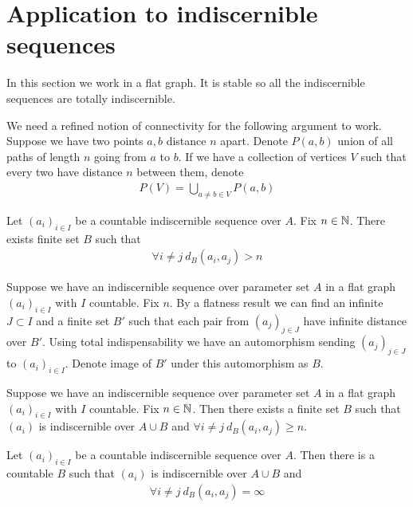 \documentclass{amsart}
\begin{document}
\section{Application to indiscernible sequences}

In this section we work in a flat graph. It is stable so all the indiscernible sequences are totally indiscernible.

We need a refined notion of connectivity for the following argument to work. Suppose we have two points $a,b$ distance $n$ apart. Denote $P(a,b)$ union of all paths of length $n$ going from $a$ to $b$. If we have a collection of vertices $V$ such that every two have distance $n$ between them, denote
\begin{align*}
	P(V) = \bigcup_{a \neq b \in V} P(a,b)
\end{align*}

\begin{Lemma}
	Let $(a_i)_{i \in I}$ be a countable indiscernible sequence over $A$. Fix $n \in \mathbb{N}$. There exists finite set $B$ such that
	\begin{align*}
		\forall i \neq j \ d_B(a_i, a_j) > n
	\end{align*}
\end{Lemma}

Suppose we have an indiscernible sequence over parameter set $A$ in a flat graph $(a_i)_{i \in I}$ with $I$ countable. Fix $n$. By a flatness result we can find an infinite $J \subset I$ and a finite set $B'$ such that each pair from $(a_j)_{j \in J}$ have infinite distance over $B'$. Using total 
indispensability we have an automorphism sending $(a_j)_{j \in J}$ to $(a_i)_{i \in I}$. Denote image of $B'$ under this automorphism as $B$.


\begin{Theorem}
	Suppose we have an indiscernible sequence over parameter set $A$ in a flat graph $(a_i)_{i \in I}$ with $I$ countable. Fix $n \in \mathbb{N}$. Then there exists a finite set $B$ such that $(a_i)$ is indiscernible over $A \cup B$ and $\forall i \neq j \ d_B(a_i, a_j) \geq n$.
\end{Theorem}

\begin{Corollary}
	Let $(a_i)_{i \in I}$ be a countable indiscernible sequence over $A$. Then there is a countable $B$ such that  $(a_i)$ is indiscernible over $A \cup B$ and
	\begin{align*}
		\forall i \neq j \ d_B(a_i, a_j) = \infty
	\end{align*}
\end{Corollary}
\end{document}
